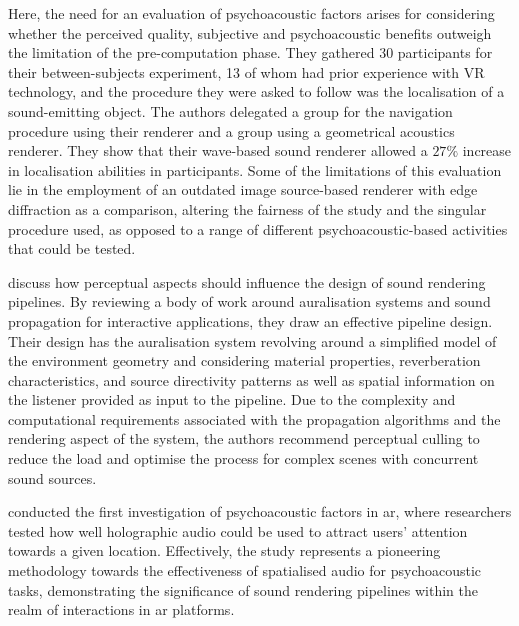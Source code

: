 Here, the need for an evaluation of psychoacoustic factors arises for considering whether the perceived quality, subjective and psychoacoustic benefits outweigh the limitation of the pre-computation phase. They gathered 30 participants for their between-subjects experiment, 13 of whom had prior experience with VR technology, and the procedure they were asked to follow was the localisation of a sound-emitting object. The authors delegated a group for the navigation procedure using their renderer and a group using a geometrical acoustics renderer. They show that their wave-based sound renderer allowed a $27\%$ increase in localisation abilities in participants. Some of the limitations of this evaluation lie in the employment of an outdated image source-based renderer with edge diffraction as a comparison, altering the fairness of the study and the singular procedure used, as opposed to a range of different psychoacoustic-based activities that could be tested.\par

\cite{hacihabiboglu2017perceptual} discuss how perceptual aspects should influence the design of sound rendering pipelines. By reviewing a body of work around auralisation systems and sound propagation for interactive applications, they draw an effective pipeline design. Their design has the auralisation system revolving around a simplified model of the environment geometry and considering material properties, reverberation characteristics, and source directivity patterns as well as spatial information on the listener provided as input to the pipeline. Due to the complexity and computational requirements associated with the propagation algorithms and the rendering aspect of the system, the authors recommend perceptual culling to reduce the load and optimise the process for complex scenes with concurrent sound sources.\par

\cite{holographic_localisation} conducted the first investigation of psychoacoustic factors in \acrshort{ar}, where researchers tested how well holographic audio could be used to attract users' attention towards a given location. Effectively, the study represents a pioneering methodology towards the effectiveness of spatialised audio for psychoacoustic tasks, demonstrating the significance of sound rendering pipelines within the realm of interactions in \acrshort{ar} platforms.\par

